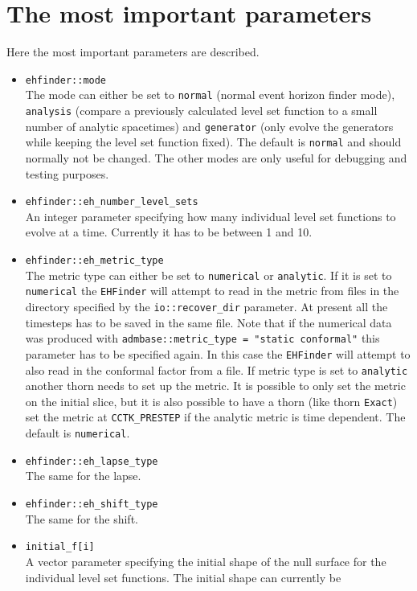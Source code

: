 \section{The most important parameters}
Here the most important parameters are described.
\begin{itemize}
\item {\tt ehfinder::mode} \\  
  The mode can either be set to {\tt normal} (normal event horizon finder
  mode), {\tt analysis} (compare a previously calculated level set function to
  a small number of analytic spacetimes) and {\tt generator} (only evolve
  the generators while keeping the level set function fixed). The
  default is {\tt normal} and should normally not be changed. The other modes
  are only useful for debugging and testing purposes.
\item{\tt ehfinder::eh\_number\_level\_sets} \\
  An integer parameter specifying how many individual level set functions to
  evolve at a time. Currently it has to be between 1 and 10.
\item {\tt ehfinder::eh\_metric\_type} \\
  The metric type can either be set to {\tt numerical} or {\tt analytic}. If
  it is set to {\tt numerical} the {\tt EHFinder} will attempt to read in the
  metric from files in the directory specified by the {\tt io::recover\_dir}
  parameter. At present all the timesteps has to be saved in the same file.
  Note that if the numerical data was produced with
  {\tt admbase::metric\_type = "static conformal"} this parameter has to be
  specified again. In this case the {\tt EHFinder} will attempt to also read
  in the conformal factor from a file.
  If metric type is set to {\tt analytic} another thorn needs to set up the
  metric. It is possible to only set the metric on the initial slice, but it
  is also possible to have a thorn (like thorn {\tt Exact}) set the metric at
  {\tt CCTK\_PRESTEP} if the analytic metric is time dependent.
  The default is {\tt numerical}.
\item {\tt ehfinder::eh\_lapse\_type} \\
  The same for the lapse.
\item {\tt ehfinder::eh\_shift\_type} \\
  The same for the shift.
\item {\tt initial\_f[i]} \\
  A vector parameter specifying the initial shape of the null surface for
  the individual level set functions. The initial shape can currently be

\end{itemize}
